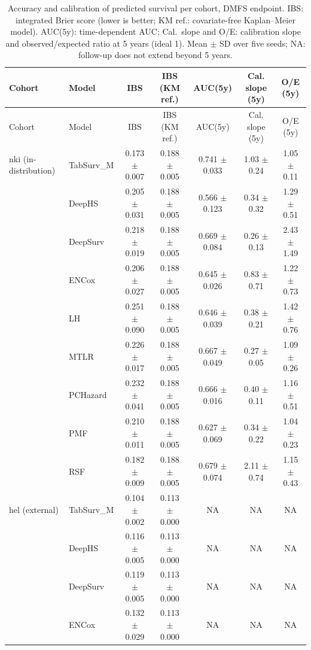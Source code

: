 \begin{longtable}{llccccc}
\caption{Accuracy and calibration of predicted survival per cohort, DMFS endpoint. IBS: integrated Brier score (lower is better; KM ref.: covariate-free Kaplan--Meier model). AUC(5y): time-dependent AUC; Cal.\ slope and O/E: calibration slope and observed/expected ratio at 5 years (ideal 1). Mean $\pm$ SD over five seeds; NA: follow-up does not extend beyond 5 years.}
\label{tab:supp_calibration_dmfs} \\
\toprule
Cohort & Model & IBS & IBS (KM ref.) & AUC(5y) & Cal. slope (5y) & O/E (5y) \\
\midrule
\endfirsthead
\toprule
Cohort & Model & IBS & IBS (KM ref.) & AUC(5y) & Cal. slope (5y) & O/E (5y) \\
\midrule
\endhead
nki (in-distribution) & TabSurv\_M & 0.173 $\pm$ 0.007 & 0.188 $\pm$ 0.005 & 0.741 $\pm$ 0.033 & 1.03 $\pm$ 0.24 & 1.05 $\pm$ 0.11 \\
 & DeepHS & 0.205 $\pm$ 0.031 & 0.188 $\pm$ 0.005 & 0.566 $\pm$ 0.123 & 0.34 $\pm$ 0.32 & 1.29 $\pm$ 0.51 \\
 & DeepSurv & 0.218 $\pm$ 0.019 & 0.188 $\pm$ 0.005 & 0.669 $\pm$ 0.084 & 0.26 $\pm$ 0.13 & 2.43 $\pm$ 1.49 \\
 & ENCox & 0.206 $\pm$ 0.027 & 0.188 $\pm$ 0.005 & 0.645 $\pm$ 0.026 & 0.83 $\pm$ 0.71 & 1.22 $\pm$ 0.73 \\
 & LH & 0.251 $\pm$ 0.090 & 0.188 $\pm$ 0.005 & 0.646 $\pm$ 0.039 & 0.38 $\pm$ 0.21 & 1.42 $\pm$ 0.76 \\
 & MTLR & 0.226 $\pm$ 0.017 & 0.188 $\pm$ 0.005 & 0.667 $\pm$ 0.049 & 0.27 $\pm$ 0.05 & 1.09 $\pm$ 0.26 \\
 & PCHazard & 0.232 $\pm$ 0.041 & 0.188 $\pm$ 0.005 & 0.666 $\pm$ 0.016 & 0.40 $\pm$ 0.11 & 1.16 $\pm$ 0.51 \\
 & PMF & 0.210 $\pm$ 0.011 & 0.188 $\pm$ 0.005 & 0.627 $\pm$ 0.069 & 0.34 $\pm$ 0.22 & 1.04 $\pm$ 0.23 \\
 & RSF & 0.182 $\pm$ 0.009 & 0.188 $\pm$ 0.005 & 0.679 $\pm$ 0.074 & 2.11 $\pm$ 0.74 & 1.15 $\pm$ 0.43 \\
\midrule
hel (external) & TabSurv\_M & 0.104 $\pm$ 0.002 & 0.113 $\pm$ 0.000 & NA & NA & NA \\
 & DeepHS & 0.116 $\pm$ 0.005 & 0.113 $\pm$ 0.000 & NA & NA & NA \\
 & DeepSurv & 0.119 $\pm$ 0.005 & 0.113 $\pm$ 0.000 & NA & NA & NA \\
 & ENCox & 0.132 $\pm$ 0.029 & 0.113 $\pm$ 0.000 & NA & NA & NA \\

\end{longtable}
